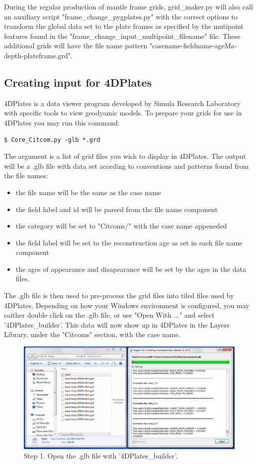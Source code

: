 \documentclass[letterpaper,12pt]{article}
\begin{document}
During the regular production of mantle frame grids, grid\_maker.py will also call an 
auxiliary script "frame\_change\_pygplates.py" with the correct options 
to transform the global data set to the plate frames as specified by 
the mutipoint features found in the "frame\_change\_input\_multipoint\_filename" file.
These additional grids will have the file name pattern "casename-fieldname-ageMa-depth-plateframe.grd".

\subsection{Creating input for 4DPlates}

4DPlates is a data viewer program developed by Simula Research Laboratory with specific tools to view geodyamic models.
To prepare your grids for use in 4DPlates you may run this command:

\begin{verbatim}
$ Core_Citcom.py -glb *.grd
\end{verbatim}

The argument is a list of grid files you wish to display in 4DPlates.  
The output will be a .glb file with data set acording to conventions and patterns found from the file names:
\begin{itemize}
\item the file name will be the same as the case name
\item the field label and id will be parsed from the file name component
\item the category will be set to "Citcoms/" with the case name appeneded 
\item the field label will be set to the reconstruction age as set in each file name component
\item the ages of appearance and disapearance will be set by the ages in the data files.
\end{itemize}

The .glb file is then used to pre-process the grid files into tiled files used by 4DPlates.
Depending on how your Windows environment is configured, you may eaither double click on the .glb file,
or use "Open With ..." and select '4DPlates\_builder'.  This data will now show up in 4DPlates in the Layers Library,
under the "Citcoms" section, with the case name.


\begin{figure}[htb]
\centering
\includegraphics[width=1.0\textwidth]{figs/4DPlates_step1.png}
\caption{Step 1. Open the .glb file with '4DPlates\_builder'. }
\label{fig:cont2ps}
\end{figure}
\end{document}
